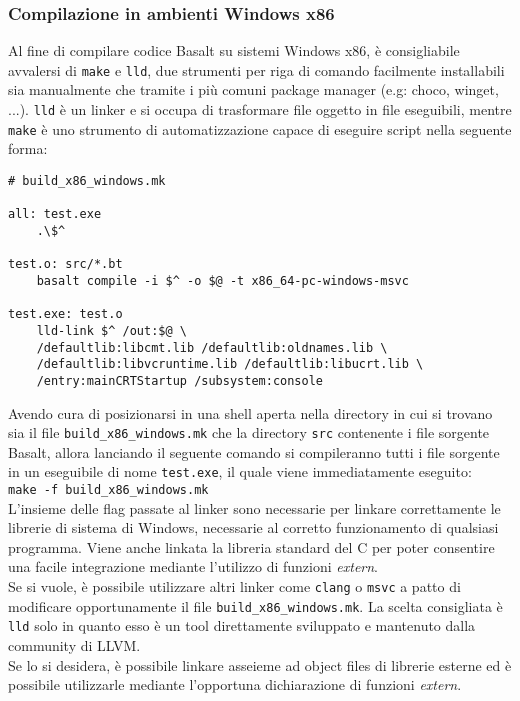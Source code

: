 \subsubsection{Compilazione in ambienti Windows x86}
Al fine di compilare codice Basalt su sistemi Windows x86, 
è consigliabile avvalersi di \texttt{make} e \texttt{lld}, due strumenti per 
riga di comando facilmente installabili sia manualmente che tramite i più comuni 
package manager (e.g: choco, winget, ...). \texttt{lld} è un linker e si occupa 
di trasformare file oggetto in file eseguibili, mentre \texttt{make} è uno strumento 
di automatizzazione capace di eseguire script nella seguente forma: \\

\vspace{0.5cm}
\begin{lstlisting}[frame=single]
# build_x86_windows.mk

all: test.exe
	.\$^

test.o: src/*.bt
	basalt compile -i $^ -o $@ -t x86_64-pc-windows-msvc

test.exe: test.o
	lld-link $^ /out:$@ \
	/defaultlib:libcmt.lib /defaultlib:oldnames.lib \
	/defaultlib:libvcruntime.lib /defaultlib:libucrt.lib \
	/entry:mainCRTStartup /subsystem:console
\end{lstlisting}
\vspace{0.5cm}

Avendo cura di posizionarsi in una shell aperta nella directory in cui si 
trovano sia il file \texttt{build\_x86\_windows.mk} che la 
directory \texttt{src} contenente i file sorgente Basalt, allora 
lanciando il seguente comando si compileranno tutti i file sorgente in un 
eseguibile di nome \texttt{test.exe}, il quale viene immediatamente eseguito: \\

\noindent\hfill \texttt{make -f build\_x86\_windows.mk} \hfill\null \\

L'insieme delle flag passate al linker sono necessarie per
linkare correttamente le librerie di sistema di Windows, necessarie al corretto 
funzionamento di qualsiasi programma. Viene anche linkata la libreria standard 
del C per poter consentire una facile integrazione mediante l'utilizzo di 
funzioni \textit{extern}. \\

Se si vuole, è possibile utilizzare altri linker come \texttt{clang} o \texttt{msvc} a patto
di modificare opportunamente il file \texttt{build\_x86\_windows.mk}. La scelta consigliata è \texttt{lld} 
solo in quanto esso è un tool direttamente sviluppato e mantenuto dalla community di LLVM. \\

Se lo si desidera, è possibile linkare asseieme ad object files di librerie esterne 
ed è possibile utilizzarle mediante l'opportuna dichiarazione di funzioni \textit{extern}. \\

\newpage
